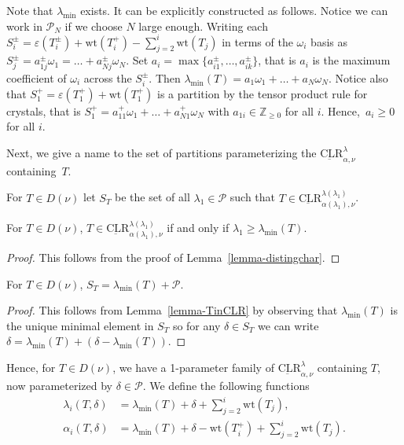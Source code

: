 \documentclass[ALCO,Unicode]{cedram}
\newcommand{\Z}{\mathbb{Z}}
\newcommand{\Par}{\mathcal{P}}
\newcommand{\wt}{\text{wt}}
\newcommand{\CLR}{\text{CLR}}
\begin{document}
Note that $\lambda_{\min}$ exists. It can be explicitly constructed as follows. Notice we can work in $\Par_N$ if we choose $N$ large enough. Writing each $S^\pm_i = \varepsilon(T_i^\pm) + \wt(T_i^+) - \sum_{j=2}^{i} \wt(T_j)$ in terms of the $\omega_i$ basis as $S^\pm_j = a^\pm_{1 j}\omega_1 = \dots + a^\pm_{N j} \omega_{N}$. Set $a_i = \max \{a^\pm_{i 1}, \dots , a^\pm_{i k} \}$, that is $a_i$ is the maximum coefficient of $\omega_i$ across the $S^\pm_i$. Then $\lambda_{\min}(T) = a_1 \omega_1 + \dots + a_{N} \omega_{N}$. Notice also that $S_1^+ = \varepsilon(T_1^+) + \wt(T_1^+)$ is a partition by the tensor product rule for crystals, that is $S_1^+ = a^+_{11} \omega_1 + \dots + a^+_{N 1} \omega_N$ with $a_{1i} \in \Z_{\geq 0}$ for all $i$. Hence,~$a_i \geq 0$ for all $i$.

Next, we give a name to the set of partitions parameterizing the $\underbar{\CLR}^\lambda_{\alpha, \nu}$ containing~$T$. 

\begin{defn}
    For $T \in D(\nu)$ let $S_T$ be the set of all $\lambda_1 \in \Par$ such that $T \in \underbar{\CLR}^{\lambda(\lambda_1)}_{\alpha(\lambda_1), \nu}$.
\end{defn}


\begin{lemma}\label{lemma-TinCLR}
    For $T \in D(\nu)$, $T \in \underbar{\CLR}^{\lambda(\lambda_1)}_{\alpha(\lambda_1), \nu}$ if and only if $\lambda_1 \geq \lambda_{\min}(T)$.
\end{lemma}

\begin{proof}
    This follows from the proof of Lemma~\ref{lemma-distingchar}.
\end{proof}

\begin{lemma}
    For $T \in D(\nu)$, $S_T = \lambda_{\min}(T) + \Par.$
\end{lemma}

\begin{proof}
    This follows from Lemma~\ref{lemma-TinCLR} by observing that $\lambda_{\min}(T)$ is the unique minimal element in $S_T$ so for any $\delta \in S_T$ we can write $\delta = \lambda_{\min}(T) + (\delta - \lambda_{\min}(T))$.
\end{proof}


Hence, for $T \in D(\nu)$, we have a 1-parameter family of $\underbar{\CLR}^\lambda_{\alpha, \nu}$ containing $T$, now parameterized by $\delta \in \Par$. We define the following functions
\begin{align*}
\lambda_i(T, \delta) &= \lambda_{\min}(T) + \delta + \sum_{j=2}^{i} \wt(T_j), \\
\alpha_i(T, \delta) &= \lambda_{\min}(T) + \delta - \wt(T_i^+) + \sum_{j=2}^{i} \wt(T_j).
\end{align*}
\end{document}
